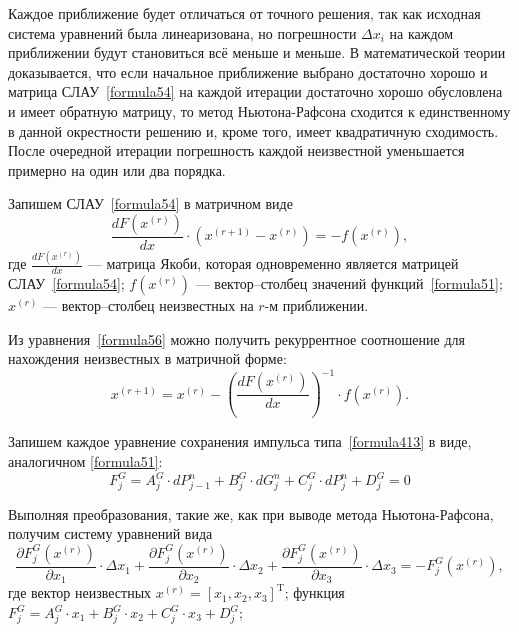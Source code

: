 Каждое приближение будет отличаться от точного решения, так как исходная система уравнений была линеаризована, но погрешности $\Delta x_i$ на каждом приближении будут становиться всё меньше и меньше. В математической теории доказывается, что если начальное приближение выбрано достаточно хорошо и матрица СЛАУ~\eqref{formula54} на каждой итерации достаточно хорошо обусловлена и имеет обратную матрицу, то метод Ньютона-Рафсона сходится к единственному в данной окрестности решению и, кроме того, имеет квадратичную сходимость. После очередной итерации погрешность каждой неизвестной уменьшается примерно на один или два порядка.

Запишем СЛАУ~\eqref{formula54} в матричном виде
\begin{equation}
\label{formula56}
\frac{dF\left(x^{(r)} \right)}{dx}\cdot \left(x^{(r+1)}-x^{(r)}\right)=-f\left(x^{(r)}\right),
\end{equation} 
где $\frac{dF\left(x^{(r)} \right)}{dx}$ --- матрица Якоби, которая одновременно является матрицей СЛАУ~\eqref{formula54}; $f\left(x^{(r)}\right)$ --- вектор--столбец значений функций~\eqref{formula51}; $x^{(r)}$ --- вектор--столбец неизвестных на $r$-м приближении. 

Из уравнения~\eqref{formula56} можно получить рекуррентное соотношение для нахождения неизвестных в матричной форме:
\begin{equation}
\label{formula57}
x^{(r+1)}=x^{(r)}-\left(\frac{dF\left(x^{(r)} \right)}{dx} \right)^{-1} \cdot f\left(x^{(r)}\right).
\end{equation}

Запишем каждое уравнение сохранения импульса типа~\eqref{formula413} в ви\-де, ана\-ло\-гич\-ном \eqref{formula51}:
\begin{equation}
\label{formula58}
F_j^G = A_j^G \cdot dP_{j-1}^n + B_j^G \cdot dG_j^n + C_j^G \cdot dP_j^n + D_j^G = 0
\end{equation} 

Выполняя преобразования, такие же, как при выводе метода Ньютона-Рафсона, получим систему уравнений вида    
\begin{equation}
\label{formula59}
\frac{\partial F_j^G(x^{(r)})}{\partial x_1}\cdot \Delta x_1 + \frac{\partial F_j^G(x^{(r)})}{\partial x_2}\cdot \Delta x_2 + \frac{\partial F_j^G(x^{(r)})}{\partial x_3}\cdot \Delta x_3 = -F_j^G(x^{(r)}),
\end{equation}
где вектор неизвестных $x^{(r)}=[x_1,x_2,x_3]^\mathrm{T}$; функция $F_j^G=A_j^G \cdot x_1 + B_j^G \cdot x_2 + C_j^G \cdot x_3 + D_j^G$;

